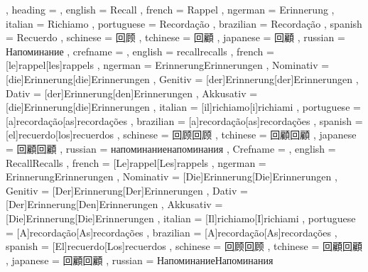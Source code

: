   {
    , heading =   {
                    , english     = Recall
                    , french      = Rappel
                    , ngerman     = Erinnerung
                    , italian     = Richiamo
                    , portuguese  = Recordação
                    , brazilian   = Recordação
                    , spanish     = Recuerdo
                    , schinese    = 回顾
                    , tchinese    = 回顧
                    , japanese    = 回顧
                    , russian     = Напоминание
                  }
    , crefname =  {
                    , english     = {recall}{recalls}
                    , french      = [le]{rappel}[les]{rappels}
                    , ngerman     = { {Erinnerung}{Erinnerungen}
                                      , Nominativ = [die]{Erinnerung}[die]{Erinnerungen}
                                      , Genitiv   = [der]{Erinnerung}[der]{Erinnerungen}
                                      , Dativ     = [der]{Erinnerung}[den]{Erinnerungen}
                                      , Akkusativ = [die]{Erinnerung}[die]{Erinnerungen}
                                    }
                    , italian     = [il]{richiamo}[i]{richiami}
                    , portuguese  = [a]{recordação}[as]{recordações}
                    , brazilian   = [a]{recordação}[as]{recordações}
                    , spanish     = [el]{recuerdo}[los]{recuerdos}
                    , schinese    = {回顾}{回顾}
                    , tchinese    = {回顧}{回顧}
                    , japanese    = {回顧}{回顧}
                    , russian     = {напоминание}{напоминания}
                  }
    , Crefname =  {
                    , english     = {Recall}{Recalls}
                    , french      = [Le]{rappel}[Les]{rappels}
                    , ngerman     = { {Erinnerung}{Erinnerungen}
                                      , Nominativ = [Die]{Erinnerung}[Die]{Erinnerungen}
                                      , Genitiv   = [Der]{Erinnerung}[Der]{Erinnerungen}
                                      , Dativ     = [Der]{Erinnerung}[Den]{Erinnerungen}
                                      , Akkusativ = [Die]{Erinnerung}[Die]{Erinnerungen}
                                    }
                    , italian     = [Il]{richiamo}[I]{richiami}
                    , portuguese  = [A]{recordação}[As]{recordações}
                    , brazilian   = [A]{recordação}[As]{recordações}
                    , spanish     = [El]{recuerdo}[Los]{recuerdos}
                    , schinese    = {回顾}{回顾}
                    , tchinese    = {回顧}{回顧}
                    , japanese    = {回顧}{回顧}
                    , russian     = {Напоминание}{Напоминания}
                  }
  }

